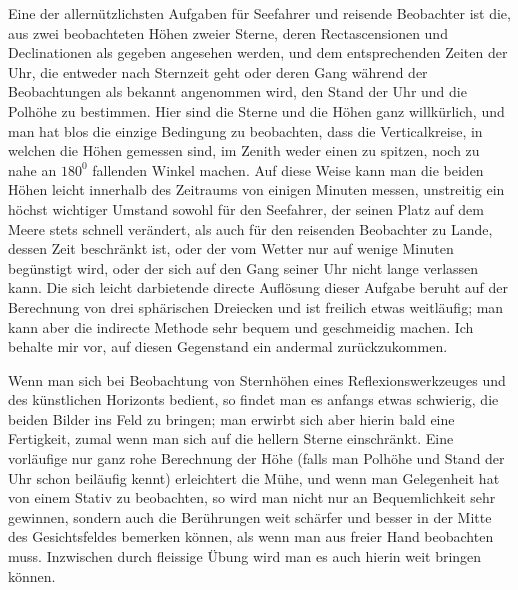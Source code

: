 Eine der allernützlichsten Aufgaben für Seefahrer und reisende Beobachter
ist die, aus zwei beobachteten Höhen zweier Sterne, deren Rectascensionen und
Declinationen als gegeben angesehen werden, und dem entsprechenden Zeiten der
Uhr, die entweder nach Sternzeit geht oder deren Gang während der Beobachtungen
als bekannt angenommen wird, den Stand der Uhr und die Polhöhe zu
bestimmen. Hier sind die Sterne und die Höhen ganz willkürlich, und man
hat blos die einzige Bedingung zu beobachten, dass die Verticalkreise, in welchen
die Höhen gemessen sind, im Zenith weder einen zu spitzen, noch zu nahe
an $180^0$ fallenden Winkel machen. Auf diese Weise kann man die beiden Höhen
leicht innerhalb des Zeitraums von einigen Minuten messen, unstreitig ein
höchst wichtiger Umstand sowohl für den Seefahrer, der seinen Platz auf dem
Meere stets schnell verändert, als auch für den reisenden Beobachter zu Lande,
dessen Zeit beschränkt ist, oder der vom Wetter nur auf wenige Minuten begünstigt
wird, oder der sich auf den Gang seiner Uhr nicht lange verlassen kann.
Die sich leicht darbietende directe Auflösung dieser Aufgabe beruht auf der Berechnung
von drei sphärischen Dreiecken und ist freilich etwas weitläufig; man
kann aber die indirecte Methode sehr bequem und geschmeidig machen. Ich behalte
mir vor, auf diesen Gegenstand ein andermal zurückzukommen.

Wenn man sich bei Beobachtung von Sternhöhen eines Reflexions\-werkzeuges
und des künstlichen Horizonts bedient, so findet man es anfangs etwas schwierig,
die beiden Bilder ins Feld zu bringen; man erwirbt sich aber hierin bald
eine Fertigkeit, zumal wenn man sich auf die hellern Sterne einschränkt. Eine
vorläufige nur ganz rohe Berechnung der Höhe (falls man Polhöhe und Stand der
Uhr schon beiläufig kennt) erleichtert die Mühe, und wenn man Gelegenheit hat
von einem Stativ zu beobachten, so wird man nicht nur an Bequemlichkeit sehr
%
gewinnen, sondern auch die Berührungen weit schärfer und besser in der Mitte
des Gesichtsfeldes bemerken können, als wenn man aus freier Hand beobachten
muss. Inzwischen durch fleissige Übung wird man es auch hierin weit bringen
können.

